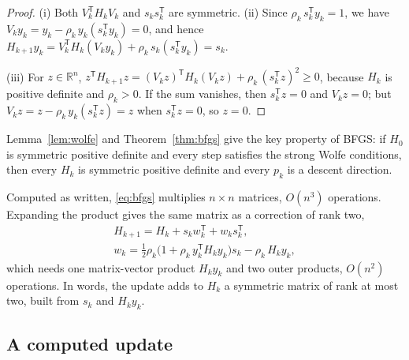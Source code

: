 \documentclass[11pt,a4paper]{amsart}
\numberwithin{equation}{section}
\theoremstyle{plain}
\theoremstyle{definition}
\theoremstyle{remark}
\newcommand{\R}{\mathbb{R}}
\newcommand{\T}{\mathsf{T}}
\begin{document}
\begin{proof}
(i) Both $V_k^\T H_k V_k$ and $s_k s_k^\T$ are symmetric.
(ii) Since $\rho_k\, s_k^\T y_k = 1$, we have
$V_k y_k = y_k - \rho_k\, y_k (s_k^\T y_k) = 0$, and hence
$H_{k+1} y_k = V_k^\T H_k (V_k y_k) + \rho_k\, s_k (s_k^\T y_k) = s_k$.

(iii) For $z \in \R^n$,
$z^\T H_{k+1} z = (V_k z)^\T H_k (V_k z) + \rho_k\, (s_k^\T z)^2 \geq 0$,
because $H_k$ is positive definite and $\rho_k > 0$. If the sum
vanishes, then $s_k^\T z = 0$ and $V_k z = 0$; but
$V_k z = z - \rho_k\, y_k (s_k^\T z) = z$ when $s_k^\T z = 0$, so
$z = 0$.
\end{proof}

Lemma~\ref{lem:wolfe} and Theorem~\ref{thm:bfgs} give the key property
of BFGS: if $H_0$ is symmetric positive definite and every step
satisfies the strong Wolfe conditions, then every $H_k$ is symmetric
positive definite and every $p_k$ is a descent direction.

Computed as written, \eqref{eq:bfgs} multiplies $n \times n$ matrices,
$O(n^3)$ operations. Expanding the product gives the same matrix as a
correction of rank two,
\begin{equation}\label{eq:rank2}
\begin{gathered}
  H_{k+1} = H_k + s_k w_k^\T + w_k s_k^\T, \\
  w_k = \tfrac12 \rho_k \bigl(1 + \rho_k\, y_k^\T H_k y_k\bigr) s_k
        - \rho_k\, H_k y_k ,
\end{gathered}
\end{equation}
which needs one matrix-vector product $H_k y_k$ and two outer products,
$O(n^2)$ operations. In words, the update adds to $H_k$ a symmetric
matrix of rank at most two, built from $s_k$ and $H_k y_k$.

\subsection{A computed update}\label{sec:example}
\end{document}
